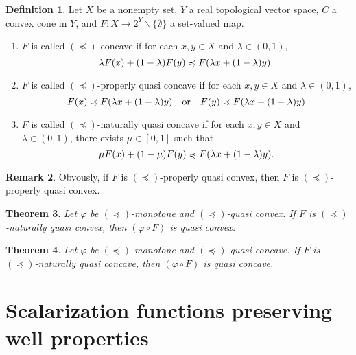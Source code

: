 \documentclass[a4paper,11pt]{jsarticle}
\newtheorem{thm}{Theorem}[section]
\theoremstyle{definition}
\newtheorem{dfn}[thm]{Definition}
\newtheorem{rem}[thm]{Remark}
\begin{document}
\begin{dfn}
  Let $X$ be a nonempty set, $Y$ a real topological vector space, $C$ a convex cone in $Y$, and $F\colon X \to 2^Y \backslash \{\emptyset\}$ a set-valued map.
  \begin{enumerate}
    \item $F$ is called $(\preccurlyeq)$-concave if for each $x,y \in X$ and $\lambda \in (0,1)$,
          \begin{equation}
            \lambda F(x) + (1-\lambda) F(y) \preccurlyeq F(\lambda x + (1-\lambda)y) . \notag
          \end{equation}
    \item $F$ is called $(\preccurlyeq)$-properly quasi concave if for each $x,y \in X$ and $\lambda \in (0,1)$,
          \begin{equation}
            F(x) \preccurlyeq F(\lambda x + (1-\lambda)y) \quad \text{or} \quad F(y) \preccurlyeq F(\lambda x + (1-\lambda)y) \notag
          \end{equation}
    \item $F$ is called $(\preccurlyeq)$-naturally quasi concave if for each $x,y \in X$ and $\lambda \in (0,1)$, there exists $\mu \in [0,1]$ such that
          \begin{equation}
            \mu F(x) + (1-\mu) F(y) \preccurlyeq F(\lambda x + (1-\lambda)y). \notag
          \end{equation}
  \end{enumerate}
\end{dfn}

\begin{rem}
  Obvously, if $F$ is $(\preccurlyeq)$-properly quasi convex, then $F$ is $(\preccurlyeq)$-properly quasi convex.
\end{rem}

\begin{thm}
  Let $\varphi$ be $(\preccurlyeq)$-monotone and $(\preccurlyeq)$-quasi convex. If $F$ is $(\preccurlyeq)$-naturally quasi convex, then $(\varphi \circ F)$ is quasi convex.
\end{thm}

\begin{thm}
  Let $\varphi$ be $(\preccurlyeq)$-monotone and $(\preccurlyeq)$-quasi concave. If $F$ is $(\preccurlyeq)$-naturally quasi concave, then $(\varphi \circ F)$ is quasi concave.
\end{thm}

\section{Scalarization functions preserving well properties}
\end{document}
